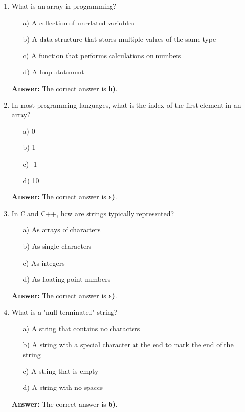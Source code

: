 \documentclass{article}
\begin{document}
\begin{enumerate}
    \item What is an array in programming?
    \begin{enumerate}
        \item[a)] A collection of unrelated variables
        \item[b)] A data structure that stores multiple values of the same type
        \item[c)] A function that performs calculations on numbers
        \item[d)] A loop statement
    \end{enumerate}
    \textbf{Answer:} The correct answer is \textbf{b)}.

    \item In most programming languages, what is the index of the first element in an array?
    \begin{enumerate}
        \item[a)] 0
        \item[b)] 1
        \item[c)] -1
        \item[d)] 10
    \end{enumerate}
    \textbf{Answer:} The correct answer is \textbf{a)}.

    \item In C and C++, how are strings typically represented?
    \begin{enumerate}
        \item[a)] As arrays of characters
        \item[b)] As single characters
        \item[c)] As integers
        \item[d)] As floating-point numbers
    \end{enumerate}
    \textbf{Answer:} The correct answer is \textbf{a)}.

    \item What is a "null-terminated" string?
    \begin{enumerate}
        \item[a)] A string that contains no characters
        \item[b)] A string with a special character at the end to mark the end of the string
        \item[c)] A string that is empty
        \item[d)] A string with no spaces
    \end{enumerate}
    \textbf{Answer:} The correct answer is \textbf{b)}.


\end{enumerate}
\end{document}

